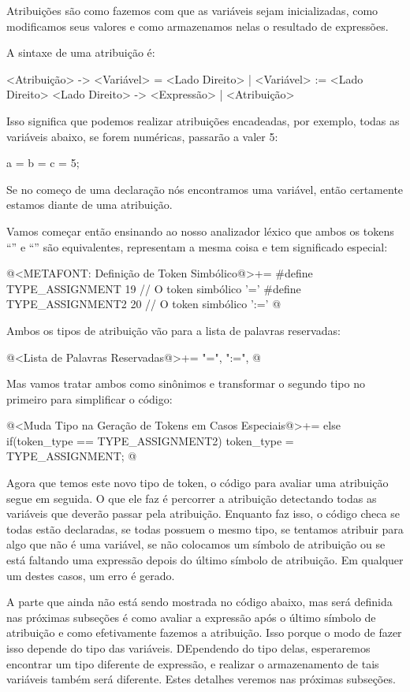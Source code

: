 
Atribuições são como fazemos com que as variáveis sejam inicializadas,
como modificamos seus valores e como armazenamos nelas o resultado de
expressões.

A sintaxe de uma atribuição é:

\alinhaverbatim
<Atribuição> -> <Variável> = <Lado Direito> |
                <Variável> := <Lado Direito>
<Lado Direito> -> <Expressão> | <Atribuição>
\alinhanormal

Isso significa que podemos realizar atribuições encadeadas, por
exemplo, todas as variáveis abaixo, se forem numéricas, passarão a
valer 5:

\alinhaverbatim
a = b = c = 5;
\alinhanormal

Se no começo de uma declaração nós encontramos uma variável, então
certamente estamos diante de uma atribuição.

Vamos começar então ensinando ao nosso analizador léxico que ambos os
tokens ``\monoespaco{=}'' e ``\monoespaco{:=}'' são equivalentes,
representam a mesma coisa e tem significado especial:

\iniciocodigo
@<METAFONT: Definição de Token Simbólico@>+=
#define TYPE_ASSIGNMENT            19 // O token simbólico '='
#define TYPE_ASSIGNMENT2           20 // O token simbólico ':='
@
\fimcodigo

Ambos os tipos de atribuição vão para a lista de palavras reservadas:

\iniciocodigo
@<Lista de Palavras Reservadas@>+=
"=", ":=",
@
\fimcodigo

Mas vamos tratar ambos como sinônimos e transformar o segundo tipo no
primeiro para simplificar o código:

\iniciocodigo
@<Muda Tipo na Geração de Tokens em Casos Especiais@>+=
else if(token_type == TYPE_ASSIGNMENT2)
  token_type = TYPE_ASSIGNMENT;
@
\fimcodigo

Agora que temos este novo tipo de token, o código para avaliar uma
atribuição segue em seguida. O que ele faz é percorrer a atribuição
detectando todas as variáveis que deverão passar pela
atribuição. Enquanto faz isso, o código checa se todas estão
declaradas, se todas possuem o mesmo tipo, se tentamos atribuir para
algo que não é uma variável, se não colocamos um símbolo de atribuição
ou se está faltando uma expressão depois do último símbolo de
atribuição. Em qualquer um destes casos, um erro é gerado.

A parte que ainda não está sendo mostrada no código abaixo, mas será
definida nas próximas subseções é como avaliar a expressão após o
último símbolo de atribuição e como efetivamente fazemos a
atribuição. Isso porque o modo de fazer isso depende do tipo das
variáveis. DEpendendo do tipo delas, esperaremos encontrar um tipo
diferente de expressão, e realizar o armazenamento de tais variáveis
também será diferente. Estes detalhes veremos nas próximas subseções.

